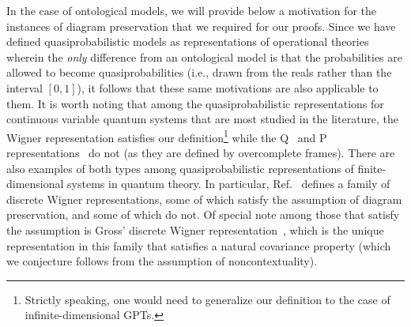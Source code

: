 \documentclass[10pt,twocolumn,aps,groupedaddress,nofootinbib]{revtex4}
\newcommand{\david}{\color{blue}}
\newcommand{\blk}{\color{black}}
\begin{document}
In the case of ontological models, we will provide below a motivation for the instances of diagram preservation that we required for our proofs. Since we have defined quasiprobabilistic models as representations of operational theories wherein the {\em only} difference from an ontological model is that the probabilities are allowed to become quasiprobabilities (i.e., drawn from the reals rather than the interval $[0,1]$), it follows that these same motivations are also applicable to them.
It is worth noting that among the quasiprobabilistic representations for continuous variable quantum systems that are most studied in the literature, the Wigner representation satisfies our definition\footnote{Strictly speaking, one would need to generalize our definition to the case of infinite-dimensional GPTs.} while the Q~\cite{Husimi} and P representations~\cite{Pfunc1,Pfunc2} do not (as they are defined by overcomplete frames).  There are also examples of both types among quasiprobabilistic representations of finite-dimensional systems in quantum theory.
In particular, Ref.~\cite{citeGHW} defines a family of discrete Wigner representations, some of which satisfy the assumption of diagram preservation, and some of which do not. Of special note among those that satisfy the assumption is Gross' discrete Wigner representation~\cite{gross2006},  which is the unique representation in this family that satisfies a natural covariance property (which we conjecture follows from the assumption of noncontextuality).
\end{document}
